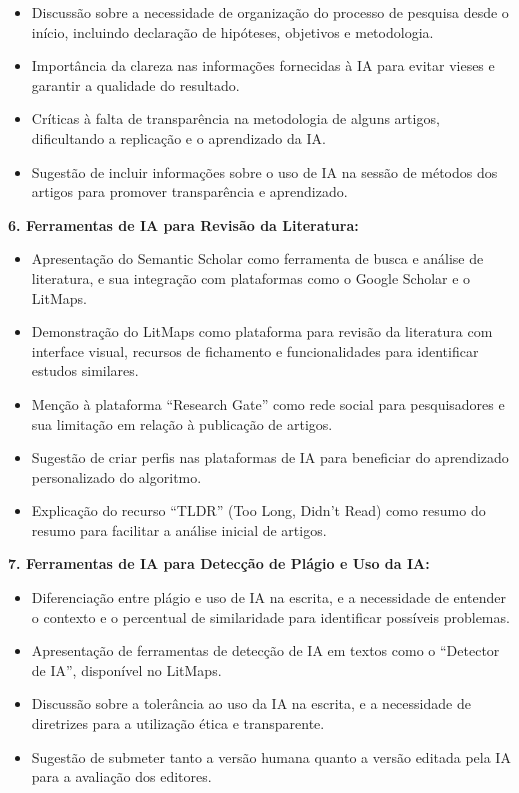 \documentclass[
  a4paper,
]{book}
\providecommand{\tightlist}{%
  \setlength{\itemsep}{0pt}\setlength{\parskip}{0pt}}\usepackage{longtable,booktabs,array}
\begin{document}
\begin{tcolorbox}
\begin{itemize}
\tightlist
\item
  Discussão sobre a necessidade de organização do processo de pesquisa
  desde o início, incluindo declaração de hipóteses, objetivos e
  metodologia.
\item
  Importância da clareza nas informações fornecidas à IA para evitar
  vieses e garantir a qualidade do resultado.
\item
  Críticas à falta de transparência na metodologia de alguns artigos,
  dificultando a replicação e o aprendizado da IA.
\item
  Sugestão de incluir informações sobre o uso de IA na sessão de métodos
  dos artigos para promover transparência e aprendizado.\vspace{0.5em}
\end{itemize}

\textbf{6. Ferramentas de IA para Revisão da Literatura:}\vspace{0.5em}

\begin{itemize}
\tightlist
\item
  Apresentação do Semantic Scholar como ferramenta de busca e análise de
  literatura, e sua integração com plataformas como o Google Scholar e o
  LitMaps.
\item
  Demonstração do LitMaps como plataforma para revisão da literatura com
  interface visual, recursos de fichamento e funcionalidades para
  identificar estudos similares.
\item
  Menção à plataforma ``Research Gate'' como rede social para
  pesquisadores e sua limitação em relação à publicação de artigos.
\item
  Sugestão de criar perfis nas plataformas de IA para beneficiar do
  aprendizado personalizado do algoritmo.
\item
  Explicação do recurso ``TLDR'' (Too Long, Didn't Read) como resumo do
  resumo para facilitar a análise inicial de artigos.\vspace{0.5em}
\end{itemize}

\textbf{7. Ferramentas de IA para Detecção de Plágio e Uso da
IA:}\vspace{0.5em}

\begin{itemize}
\tightlist
\item
  Diferenciação entre plágio e uso de IA na escrita, e a necessidade de
  entender o contexto e o percentual de similaridade para identificar
  possíveis problemas.
\item
  Apresentação de ferramentas de detecção de IA em textos como o
  ``Detector de IA'', disponível no LitMaps.
\item
  Discussão sobre a tolerância ao uso da IA na escrita, e a necessidade
  de diretrizes para a utilização ética e transparente.
\item
  Sugestão de submeter tanto a versão humana quanto a versão editada
  pela IA para a avaliação dos editores.\vspace{0.5em}
\end{itemize}


\end{tcolorbox}
\end{document}
